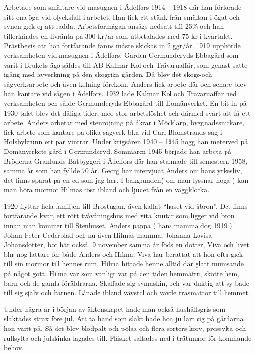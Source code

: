 Arbetade som smältare vid masugnen i Ädelfors 1914 – 1918 där han förlorade sitt ena öga vid  olycksfall i arbetet. Han fick ett stänk från smältan i ögat och synen gick ej att rädda. Arbetsförmågan ansågs nedsatt till 25\% och han tillerkändes en livränta på 300 kr/år som utbetalades med 75 kr i kvartalet. Prästbevis att han fortfarande fanns måste skickas in 2 ggr/år.
1919 upphörde verksamheten vid masugnen i Ädelfors.
Gården Germunderyds Ebbagård som varit i Brukets ägo såldes till AB Kalmar Kol och Trävaruaffär, som genast satte igång med avverkning på den skogrika gården. Då blev det skogs-och sågverksarbete och även kolning förekom. Anders fick arbete där och senare blev han kantare vid sågen i Ädelfors.
1932 lade Kalmar Kol och Trävaruaffär ned verksamheten och sålde Germunderyds Ebbagård till Domänverket.
En bit in på 1930-talet blev det dåliga tider, med stor arbetslöshet och därmed svårt att få ett arbete. Anders arbetar med stenröjning på åkrar i Möcklarp, byggnadssnickare, fick arbete som kantare på olika sågverk bl.a vid Carl Blomstrands såg i Holsbybrunn ett par vintrar.
Under krigsåren 1940 – 1945 högg han meterved på Domänverkets gård i Germunderyd. Sommaren 1945 började han arbeta på Bröderna Granlunds Båtbyggeri i Ädelfors där han stannade till semestern 1958, samma år som han fyllde 70 år.
Georg har intervjuat Anders om hans yrkesliv, det finns sparat på en cd som jag har. I bakgrunden( om man lyssnar noga ) kan man höra mormor Hilmas röst ibland och ljudet från en väggklocka.


1920 flyttar hela familjen till Brostugan, även kallat “huset vid åbron”. Det finns fortfarande kvar, ett rött tvåvåningshus med vita knutar som ligger vid bron innan man kommer till Stenhuset. 
Anders pappa ( hans mamma dog 1919 ) Johan Peter Cederblad och nu även Hilmas mamma, Johanna Lovisa Johansdotter, bor här också. 
9 november samma år föds en dotter, Viva och livet blir nog lättare för både Anders och Hilma.
Viva har berättat att hon ofta gick till sin mormor till hennes rum, Hilma hittade henne alltid där glatt mumsande på något gott.
Hilma var som vanligt var på den tiden hemmafru, skötte hem, barn och de gamla föräldrarna. Skaffade sig symaskin, och var duktig att sy både till sig själv och barnen. Lånade ibland vävstol och vävde trasmattor till hemmet.


Under några år i början av äktenskapet hade man också hushållsgris som slaktades strax före jul. Att ta hand som slakt hade hon ju lärt sig på gårdarna hon varit på. Så det blev blodpalt och pölsa och flera sorters korv, pressylta och rullsylta och julskinka lagades till. Fläsket saltades ned i trätunnor för kommande behov.


